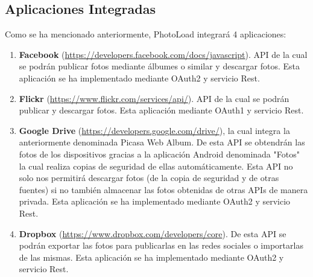 \documentclass{scrartcl}
\begin{document}

\subsection{Aplicaciones Integradas}\label{cap:APIs Integradas}
Como se ha mencionado anteriormente, PhotoLoad integrará 4 aplicaciones:
\begin{enumerate}[\textbf{\textperiodcentered}]
	\item \textbf{Facebook} (\url{https://developers.facebook.com/docs/javascript}). API de la cual se podrán publicar fotos mediante álbumes o similar y descargar fotos. Esta aplicación se ha implementado mediante OAuth2 y servicio Rest.
	\item \textbf{Flickr} (\url{https://www.flickr.com/services/api/}). API de la cual se podrán publicar y descargar fotos. Esta aplicación mediante OAuth1 y servicio Rest.
	\item \textbf{Google Drive} (\url{https://developers.google.com/drive/}), la cual integra la anteriormente denominada Picasa Web Album. De esta API se obtendrán las fotos de los dispositivos gracias a la aplicación Android denominada "Fotos" la cual realiza copias de seguridad de ellas automáticamente. Esta API no solo nos permitirá descargar fotos (de la copia de seguridad y de otras fuentes) si no también almacenar las fotos obtenidas de otras APIs de manera privada. Esta aplicación se ha implementado mediante OAuth2 y servicio Rest.
	\item \textbf{Dropbox} (\url{https://www.dropbox.com/developers/core}). De esta API se podrán exportar las fotos para publicarlas en las redes sociales o importarlas de las mismas. Esta aplicación se ha implementado mediante OAuth2 y servicio Rest.
	
\end{enumerate}
\end{document}
